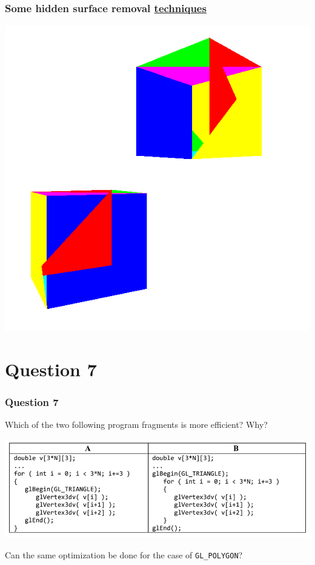 \documentclass{beamer}
\begin{document}
\begin{frame}
    \frametitle{Some hidden surface removal \href{https://gabrielgambetta.com/computer-graphics-from-scratch/12-hidden-surface-removal.html}{techniques}}

    \begin{center}
        \includegraphics[scale=0.2]{hsr.png}
    \end{center}

\end{frame}

\section{Question 7}

\begin{frame}
    \frametitle{Question 7}
    Which of the two following program fragments is more efficient? Why?

    \begin{center}
        \includegraphics[scale=0.7]{q7.png}
    \end{center}

    Can the same optimization be done for the case of \texttt{GL\_POLYGON}?
\end{frame}
\end{document}
